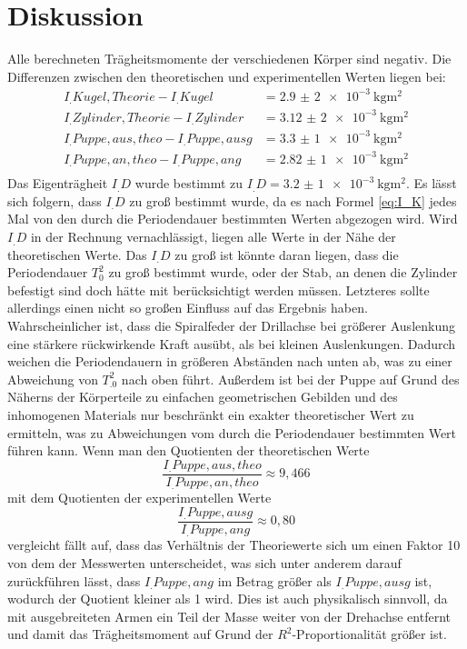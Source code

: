 \section{Diskussion}
\label{sec:Diskussion}
Alle berechneten Trägheitsmomente der verschiedenen Körper sind negativ.
Die Differenzen zwischen den theoretischen und experimentellen Werten liegen bei:
\begin{align*}
I_.{Kugel,Theorie}-I_.{Kugel}		&=\SI{2,9(2)e-3}{\kilo\gram\metre\squared}\\
I_.{Zylinder,Theorie}-I_.{Zylinder}	&=\SI{3,12(2)e-3}{\kilo\gram\metre\squared}\\
I_.{Puppe,aus,theo}-I_.{Puppe,ausg}	&=\SI{3,3(1)e-3}{\kilo\gram\metre\squared}\\
I_.{Puppe,an,theo}-I_.{Puppe,ang}	&=\SI{2,82(1)e-3}{\kilo\gram\metre\squared}\\
\end{align*}
Das Eigenträgheit $I_.D$ wurde bestimmt zu $I_.D=\SI{3,2(1)e-3}{\kilo\gram\metre\squared}$.
Es lässt sich folgern, dass $I_.D$ zu groß bestimmt wurde, da es nach Formel \eqref{eq:I_K} jedes Mal von den durch die Periodendauer bestimmten Werten abgezogen wird. Wird $I_.D$ in der Rechnung vernachlässigt, liegen alle Werte in der Nähe der theoretischen Werte.\newline
Das $I_.D$ zu groß ist könnte daran liegen, dass die Periodendauer $T_0^2$ zu groß bestimmt wurde, oder der Stab, an denen die Zylinder befestigt sind doch hätte mit berücksichtigt werden müssen. Letzteres sollte allerdings einen nicht so großen Einfluss auf das Ergebnis haben. Wahrscheinlicher ist, dass die Spiralfeder der Drillachse bei größerer Auslenkung eine stärkere rückwirkende Kraft ausübt, als bei kleinen Auslenkungen. Dadurch weichen die Periodendauern in größeren Abständen nach unten ab, was zu einer Abweichung von $T_.0^2$ nach oben führt.\newline
Außerdem ist bei der Puppe auf Grund des Näherns der Körperteile zu einfachen geometrischen Gebilden und des inhomogenen Materials nur beschränkt ein exakter theoretischer Wert zu ermitteln, was zu Abweichungen vom durch die Periodendauer bestimmten Wert führen kann.
Wenn man den Quotienten der theoretischen Werte \[\frac{I_.{Puppe,aus,theo}}{I_.{Puppe,an,theo}}\approx 9,466\]
mit dem Quotienten der experimentellen Werte \[\frac{I_.{Puppe,ausg}}{I_.{Puppe,ang}}\approx 0,80\]
vergleicht fällt auf, dass das Verhältnis der Theoriewerte sich um einen Faktor 10 von dem der Messwerten unterscheidet, was sich unter anderem darauf zurückführen lässt, dass $I_.{Puppe,ang}$ im Betrag größer als $I_.{Puppe,ausg}$ ist, wodurch der Quotient kleiner als 1 wird. Dies ist auch physikalisch sinnvoll, da mit ausgebreiteten Armen ein Teil der Masse weiter von der Drehachse entfernt und damit das Trägheitsmoment auf Grund der $R^2$-Proportionalität größer ist.